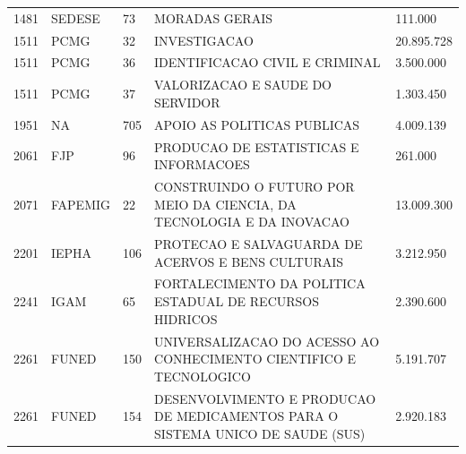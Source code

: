 \documentclass{article}
\begin{document}
\begin{longtable}[c]{m{1cm}|m{1.5cm}|m{1cm}m{10cm}|m{2cm}}
\multicolumn{1}{C{1cm}|}{1481} & \multicolumn{1}{L{1.5cm}|}{SEDESE} & \multicolumn{1}{C{1cm}|}{73} & \multicolumn{1}{L{10cm}|}{MORADAS GERAIS} & \multicolumn{1}{R{2cm}}{111.000} \\
\multicolumn{1}{C{1cm}|}{1511} & \multicolumn{1}{L{1.5cm}|}{PCMG} & \multicolumn{1}{C{1cm}|}{32} & \multicolumn{1}{L{10cm}|}{INVESTIGACAO} & \multicolumn{1}{R{2cm}}{20.895.728} \\
\multicolumn{1}{C{1cm}|}{1511} & \multicolumn{1}{L{1.5cm}|}{PCMG} & \multicolumn{1}{C{1cm}|}{36} & \multicolumn{1}{L{10cm}|}{IDENTIFICACAO CIVIL E CRIMINAL} & \multicolumn{1}{R{2cm}}{3.500.000} \\
\multicolumn{1}{C{1cm}|}{1511} & \multicolumn{1}{L{1.5cm}|}{PCMG} & \multicolumn{1}{C{1cm}|}{37} & \multicolumn{1}{L{10cm}|}{VALORIZACAO E SAUDE DO SERVIDOR} & \multicolumn{1}{R{2cm}}{1.303.450} \\
\multicolumn{1}{C{1cm}|}{1951} & \multicolumn{1}{L{1.5cm}|}{NA} & \multicolumn{1}{C{1cm}|}{705} & \multicolumn{1}{L{10cm}|}{APOIO AS POLITICAS PUBLICAS} & \multicolumn{1}{R{2cm}}{4.009.139} \\
\multicolumn{1}{C{1cm}|}{2061} & \multicolumn{1}{L{1.5cm}|}{FJP} & \multicolumn{1}{C{1cm}|}{96} & \multicolumn{1}{L{10cm}|}{PRODUCAO DE ESTATISTICAS E INFORMACOES} & \multicolumn{1}{R{2cm}}{261.000} \\
\multicolumn{1}{C{1cm}|}{2071} & \multicolumn{1}{L{1.5cm}|}{FAPEMIG} & \multicolumn{1}{C{1cm}|}{22} & \multicolumn{1}{L{10cm}|}{CONSTRUINDO O FUTURO POR MEIO DA CIENCIA, DA TECNOLOGIA E DA INOVACAO} & \multicolumn{1}{R{2cm}}{13.009.300} \\
\multicolumn{1}{C{1cm}|}{2201} & \multicolumn{1}{L{1.5cm}|}{IEPHA} & \multicolumn{1}{C{1cm}|}{106} & \multicolumn{1}{L{10cm}|}{PROTECAO E SALVAGUARDA DE ACERVOS E BENS CULTURAIS} & \multicolumn{1}{R{2cm}}{3.212.950} \\
\multicolumn{1}{C{1cm}|}{2241} & \multicolumn{1}{L{1.5cm}|}{IGAM} & \multicolumn{1}{C{1cm}|}{65} & \multicolumn{1}{L{10cm}|}{FORTALECIMENTO DA POLITICA ESTADUAL DE RECURSOS HIDRICOS} & \multicolumn{1}{R{2cm}}{2.390.600} \\
\multicolumn{1}{C{1cm}|}{2261} & \multicolumn{1}{L{1.5cm}|}{FUNED} & \multicolumn{1}{C{1cm}|}{150} & \multicolumn{1}{L{10cm}|}{UNIVERSALIZACAO DO ACESSO AO CONHECIMENTO CIENTIFICO E TECNOLOGICO} & \multicolumn{1}{R{2cm}}{5.191.707} \\
\multicolumn{1}{C{1cm}|}{2261} & \multicolumn{1}{L{1.5cm}|}{FUNED} & \multicolumn{1}{C{1cm}|}{154} & \multicolumn{1}{L{10cm}|}{DESENVOLVIMENTO E PRODUCAO DE MEDICAMENTOS PARA O SISTEMA UNICO DE SAUDE (SUS)} & \multicolumn{1}{R{2cm}}{2.920.183} \\

\end{longtable}
\end{document}
